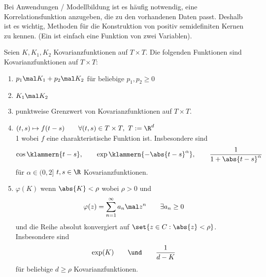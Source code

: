 Bei Anwendungen / Modellbildung ist es häufig notwendig, eine Korrelationsfunktion anzugeben, die zu den vorhandenen Daten passt.
Deshalb ist es wichtig, Methoden für die Konstruktion von positiv semidefiniten Kernen zu kennen.
(Ein  ist einfach eine Funktion von zwei Variablen).

\begin{aufgabenr}\label{aufg:19}\enter
	Seien $K,K_1,K_2$ Kovarianzfunktionen auf $T\times T$.
	Die folgenden Funktionen sind Kovarianzfunktionen auf $T\times T$:
	\begin{enumerate}[label=(\roman*)]
		\item $\begin{aligned}
			p_1\mal K_1+p_2\mal K_2
		\end{aligned}$ für beliebige $p_1,p_2\geq0$
		\label{item:aufg19_i}
		\item $K_1\mal K_2$
		\label{item:aufg19_ii}
		\item punktweise Grenzwert von Kovarianzfunktionen auf $T\times T$.
		\label{item:aufg19_iii}
		\item $\begin{aligned}
			(t,s)\mapsto f(t-s)\qquad\forall (t,s)\in T\times T,~T:=\R^d
		\end{aligned}$\\1
		wobei $f$ eine charakteristische Funktion ist.
		Insbesondere sind
		\begin{align*}
			\cos\klammern{t-s},\qquad\exp\klammern{-\abs{t-s}^\alpha},\qquad
			\frac{1}{1+\abs{t-s}^\alpha}
		\end{align*}
		für $\alpha\in(0,2]$ $t,s\in\R$ Kovarianzfunktionen.
		\label{item:aufg19_iv}
		\item $\varphi(K)$ wenn $\abs{K}<\rho$ wobei $\rho>0$ und 
		\begin{align*}
			\varphi(z)=\sum\limits_{n=1}^\infty a_n\mal z^n\qquad\exists a_n\geq 0
		\end{align*}
		und die Reihe absolut konvergiert auf $\set{z\in C:\abs{z}<\rho}$.
		Insbesondere sind 
		\begin{align*}
			\exp(K)
			\qquad\und\qquad
			\frac{1}{d-K}
		\end{align*}
		für beliebige $d\geq \rho$ Kovarianzfunktionen.
		\label{item:aufg19_v}
	\end{enumerate}
\end{aufgabenr}

\setcounter{satz}{5}

